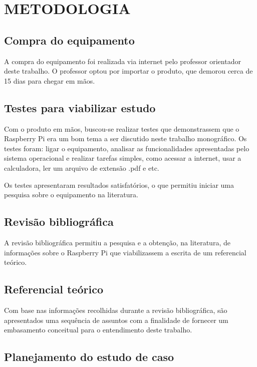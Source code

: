 \chapter{METODOLOGIA}

\section{Compra do equipamento}

A compra do equipamento foi realizada via internet pelo professor orientador deste trabalho. O professor optou por importar o produto, que demorou cerca de 15 dias para chegar em mãos.

\section{Testes para viabilizar estudo}

Com o produto em mãos, buscou-se realizar testes que demonstrassem que o Raspberry Pi era um bom tema a ser discutido neste trabalho monográfico. Os testes foram: ligar o equipamento, analisar as funcionalidades apresentadas pelo sistema operacional e realizar tarefas simples, como acessar a internet, usar a calculadora, ler um arquivo de extensão .pdf e etc.

Os testes apresentaram resultados satisfatórios, o que permitiu iniciar uma pesquisa sobre o equipamento na literatura.

\section{Revisão bibliográfica}

A revisão bibliográfica permitiu a pesquisa e a obtenção, na literatura, de informações sobre o Raspberry Pi que viabilizassem a escrita de um referencial teórico.

\section{Referencial teórico}

Com base nas informações recolhidas durante a revisão bibliográfica, são apresentados uma sequência de assuntos com a finalidade de fornecer um embasamento conceitual para o entendimento deste trabalho.

\section{Planejamento do estudo de caso}


